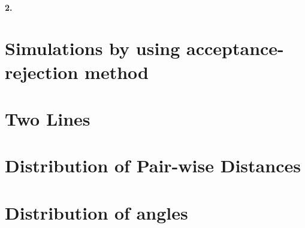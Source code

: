 \documentclass[14pt]
{article}
\begin{document}
\paragraph*{2.} 

\section{Simulations by using acceptance-rejection method} %
\bigskip

\section{Two Lines} %
\bigskip

\section{Distribution of Pair-wise Distances} %
\bigskip

\section{Distribution of angles} %
\bigskip
\end{document}
